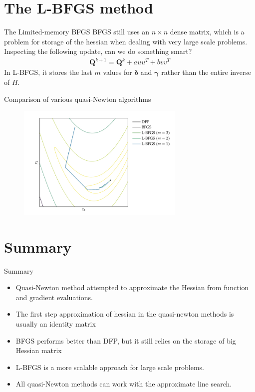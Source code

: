 \documentclass{beamer}
\begin{document}
\section{The L-BFGS method}
\begin{frame}{The Limited-memory BFGS}
BFGS still uses an $n \times n$ dense matrix, which is a problem for storage of the hessian when dealing with very large scale problems.
Inspecting the following update, can we do something smart?
\begin{gather*}
    \boldsymbol{Q}^{k+1} = \boldsymbol{Q}^{k} + a uu^T + bvv^T
\end{gather*}
In L-BFGS, it stores the last $m$ values for $\boldsymbol{\delta}$ and $\boldsymbol{\gamma}$ rather than the entire inverse of $H$.
\vspace{5cm}

\end{frame}

\begin{frame}{Comparison of various quasi-Newton algorithms}
\begin{figure}
\centering
\includegraphics[width=80mm]{Figs/quasi-newton.jpeg}
\end{figure}   
\end{frame}


\section{Summary}
\begin{frame}{Summary}
    \begin{itemize}
        \item Quasi-Newton method attempted to approximate the Hessian from function and gradient evaluations.
        \item The first step approximation of hessian in the quasi-newton methods is usually an identity matrix
        \item BFGS performs better than DFP, but it still relies on the storage of big Hessian matrix
        \item L-BFGS is a more scalable approach for large scale problems.
        \item All quasi-Newton methods can work with the approximate line search.
    \end{itemize}
\end{frame}
\end{document}
